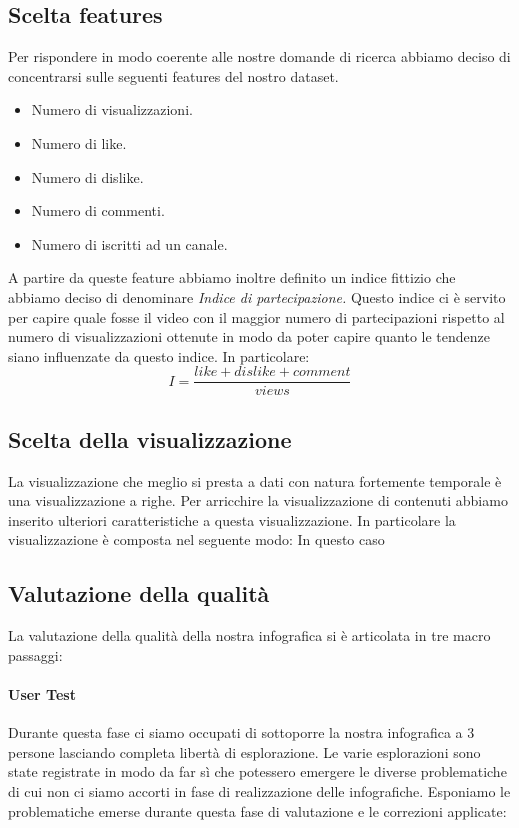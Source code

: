 \documentclass[10pt, a4paper,openany]{article}
\begin{document}
\subsection*{Scelta features}
Per rispondere in modo coerente alle nostre domande di ricerca abbiamo deciso di concentrarsi sulle seguenti features del nostro dataset.
\begin{itemize}
	\item Numero di visualizzazioni.
	\item Numero di like.
	\item Numero di dislike.
	\item Numero di commenti.
	\item Numero di iscritti ad un canale.
\end{itemize}

A partire da queste feature abbiamo inoltre definito un indice fittizio che abbiamo deciso di denominare \textit{Indice di partecipazione.} Questo indice ci è servito per capire quale fosse il video con il maggior numero di partecipazioni rispetto al numero di visualizzazioni ottenute in modo da poter capire quanto le tendenze siano influenzate da questo indice. In particolare:
\[ I = \frac{like+dislike+comment}{views}\]
\subsection*{Scelta della visualizzazione}
La visualizzazione che meglio si presta a dati con natura fortemente temporale è una visualizzazione a righe. Per arricchire la visualizzazione di contenuti abbiamo inserito ulteriori caratteristiche a questa visualizzazione. In particolare la visualizzazione è composta nel seguente modo:
In questo caso 
\subsection*{Valutazione della qualità}
La valutazione della qualità della nostra infografica si è articolata in tre macro passaggi:

\paragraph{User Test} Durante questa fase ci siamo occupati di sottoporre la nostra infografica a 3 persone lasciando completa libertà di esplorazione. Le varie esplorazioni sono state registrate in modo da far sì che potessero emergere le diverse problematiche di cui non ci siamo accorti in fase di realizzazione delle infografiche. Esponiamo le problematiche emerse durante questa fase di valutazione e le correzioni applicate:
\end{document}
